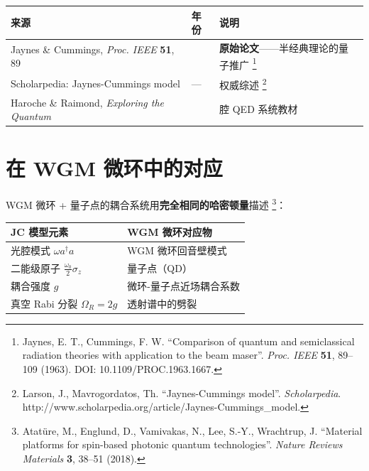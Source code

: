 \documentclass[
  11pt,
  a4paper,
]{ctexrep}
\newcounter{none} %
\begin{document}
{\def\LTcaptype{none} %
\begin{longtable}[]{@{}
  >{\raggedright\arraybackslash}p{}
  >{\centering\arraybackslash}p{}
  >{\raggedright\arraybackslash}p{}@{}}
\toprule\noalign{}
\begin{minipage}[b]{\linewidth}\raggedright
来源
\end{minipage} & \begin{minipage}[b]{\linewidth}\centering
年份
\end{minipage} & \begin{minipage}[b]{\linewidth}\raggedright
说明
\end{minipage} \\
\midrule\noalign{}
\endhead
\bottomrule\noalign{}
\endlastfoot
Jaynes \& Cummings, \emph{Proc. IEEE} \textbf{51}, 89 & 1963 &
\textbf{原始论文}------半经典理论的量子推广 \footnote{Jaynes, E. T.,
  Cummings, F. W. ``Comparison of quantum and semiclassical radiation
  theories with application to the beam maser''. \emph{Proc. IEEE}
  \textbf{51}, 89--109 (1963). DOI: 10.1109/PROC.1963.1667.} \\
Scholarpedia: Jaynes-Cummings model & --- & 权威综述 \footnote{Larson,
  J., Mavrogordatos, Th. ``Jaynes-Cummings model''. \emph{Scholarpedia}.
  http://www.scholarpedia.org/article/Jaynes-Cummings\_model.} \\
Haroche \& Raimond, \emph{Exploring the Quantum} & 2006 & 腔 QED
系统教材 \\
\end{longtable}
}

\section{在 WGM
微环中的对应}\label{ux5728-wgm-ux5faeux73afux4e2dux7684ux5bf9ux5e94}

WGM 微环 + 量子点的耦合系统用\textbf{完全相同的哈密顿量}描述
\footnote{Atatüre, M., Englund, D., Vamivakas, N., Lee, S.-Y.,
  Wrachtrup, J. ``Material platforms for spin-based photonic quantum
  technologies''. \emph{Nature Reviews Materials} \textbf{3}, 38--51
  (2018).}：

{\def\LTcaptype{none} %
\begin{longtable}[]{@{}ll@{}}
\toprule\noalign{}
JC 模型元素 & WGM 微环对应物 \\
\midrule\noalign{}
\endhead
\bottomrule\noalign{}
\endlastfoot
光腔模式 \(\omega a^\dagger a\) & WGM 微环回音壁模式 \\
二能级原子 \(\frac{\omega_0}{2}\sigma_z\) & 量子点（QD） \\
耦合强度 \(g\) & 微环-量子点近场耦合系数 \\
真空 Rabi 分裂 \(\Omega_R = 2g\) & 透射谱中的劈裂 \\
\end{longtable}
}
\end{document}
